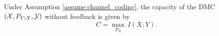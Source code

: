 \documentclass[11pt,a4paper]{article}
\begin{document}
\begin{theorem}
    Under Assumption \ref{assume:channel_coding}, the capacity of the DMC $(\mathcal{X},P_{Y|X},\mathcal{Y})$ without feedback is given by
    \begin{equation*}
        C = \max_{P_X}\,I(X;Y).
    \end{equation*}
\end{theorem}



\end{document}
